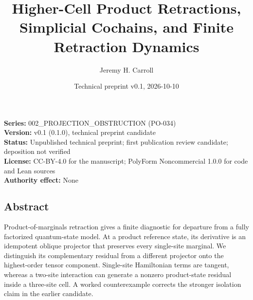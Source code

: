 \documentclass[
  11pt,
]{article}
\title{Higher-Cell Product Retractions, Simplicial Cochains, and Finite Retraction Dynamics}
\author{Jeremy H. Carroll}
\date{Technical preprint v0.1, 2026-10-10}
\begin{document}
\maketitle

\textbf{Series:} 002\_PROJECTION\_OBSTRUCTION (PO-034)\\
\textbf{Version:} v0.1 (0.1.0), technical preprint candidate\\
\textbf{Status:} Unpublished technical preprint; first publication review candidate; deposition not verified\\
\textbf{License:} CC-BY-4.0 for the manuscript; PolyForm Noncommercial 1.0.0 for code and Lean sources\\
\textbf{Authority effect:} None

\subsection{Abstract}\label{abstract}

Product-of-marginals retraction gives a finite diagnostic for departure from a fully factorized quantum-state model. At a product reference state, its derivative is an idempotent oblique projector that preserves every single-site marginal. We distinguish its complementary residual from a different projector onto the highest-order tensor component. Single-site Hamiltonian terms are tangent, whereas a two-site interaction can generate a nonzero product-state residual inside a three-site cell. A worked counterexample corrects the stronger isolation claim in the earlier candidate.
\end{document}
